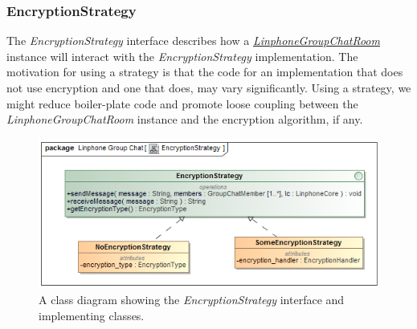 \documentclass[11pt]{article}
\begin{document}
\subsubsection{EncryptionStrategy}
The \textit{EncryptionStrategy} interface describes how a \textit{ \hyperref[subsubsec: linphonegroupchatroom]{LinphoneGroupChatRoom}} instance will interact with the \textit{EncryptionStrategy} implementation. The motivation for using a strategy is that the code for an implementation that does not use encryption and one that does, may vary significantly. Using a strategy, we might reduce boiler-plate code and promote loose coupling between the \textit{LinphoneGroupChatRoom} instance and the encryption algorithm, if any.
\begin{figure}[H]
\centering
\includegraphics[width=5in]{./images/class_encryption_strategy.png}
\caption[EncryptionStrategy Class Diagram]{A class diagram showing the \textit{EncryptionStrategy} interface and implementing classes.}
\label{cd-encryption-strategy}
\end{figure}
\end{document}
